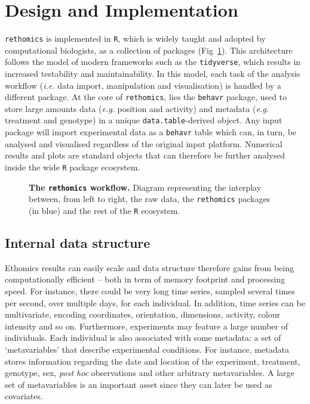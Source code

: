 \documentclass[10pt,letterpaper]{article}\usepackage[]{graphicx}\usepackage[]{color}
\begin{document}
\section*{Design and Implementation}
\texttt{rethomics} is implemented in \texttt{R}\cite{r_core_team_r:_2017}, which is widely taught and adopted by computational biologists,
as a collection of packages (Fig~\ref{fig:fig-1}).
This architecture follows the model of modern frameworks such as the \texttt{tidyverse}\cite{wickham_tidyverse:_2017}, which results in increased testability and maintainability.
In this model, each task of the analysis workflow (\emph{i.e.} data import, manipulation and visualisation) is handled by a different package.
At the core of \texttt{rethomics}, lies the \texttt{behavr} package, used to store large amounts data (\emph{e.g.} position and activity) and metadata (\emph{e.g.} treatment and genotype) in a unique \texttt{data.table}-derived object\cite{dowle_data.table:_2017}.
Any input package will import experimental data as a \texttt{behavr} table which can, in turn, be analysed and visualised regardless of the original input platform.
Numerical results and plots are standard objects that can therefore be further analysed inside the wide \texttt{R} package ecosystem.




\begin{figure}[!h]
	\caption{{\bf The \texttt{rethomics} workflow.}
		Diagram representing the interplay between, from left to right, the raw data, the \texttt{rethomics} packages (in blue) and the rest of the \texttt{R} ecosystem.}
	\label{fig:fig-1}
\end{figure}


\subsection*{Internal data structure}

Ethomics results can easily scale and data structure therefore gains from being computationally efficient – both in term of memory footprint and processing speed.
For instance, there could be very long time series, sampled several times per second, over multiple days, for each individual. %
In addition, time series can be multivariate, encoding coordinates, orientation, dimensions, activity, colour intensity and so on.
Furthermore, experiments may  feature a large number of individuals. %
Each individual is also associated with some metadata: a set of `metavariables' that describe experimental conditions.
For instance, metadata stores information regarding the date and location of the experiment, treatment, genotype, sex, \emph{post hoc} observations and other arbitrary metavariables.
A large set of metavariables is an important asset since they can later be used as covariates. 
\end{document}
